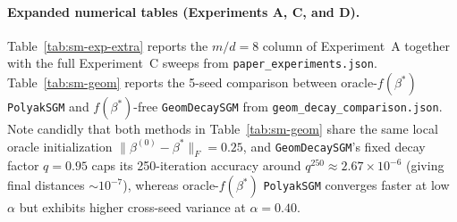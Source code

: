 \documentclass[11pt]{article}
\newcommand{\Fnorm}[1]{\|#1\|_F}
\begin{document}
\paragraph{Expanded numerical tables (Experiments A, C, and D).}
Table~\ref{tab:sm-exp-extra} reports the $m/d = 8$ column of Experiment~A together with the full Experiment~C sweeps from \nolinkurl{paper_experiments.json}. Table~\ref{tab:sm-geom} reports the 5-seed comparison between oracle-$f(\beta^*)$ \texttt{PolyakSGM} and $f(\beta^*)$-free \texttt{GeomDecaySGM} from \nolinkurl{geom_decay_comparison.json}. Note candidly that both methods in Table~\ref{tab:sm-geom} share the same local oracle initialization $\Fnorm{\beta^{(0)} - \beta^*} = 0.25$, and \texttt{GeomDecaySGM}'s fixed decay factor $q = 0.95$ caps its 250-iteration accuracy around $q^{250} \approx 2.67 \times 10^{-6}$ (giving final distances $\sim 10^{-7}$), whereas oracle-$f(\beta^*)$ \texttt{PolyakSGM} converges faster at low $\alpha$ but exhibits higher cross-seed variance at $\alpha = 0.40$.
\end{document}
